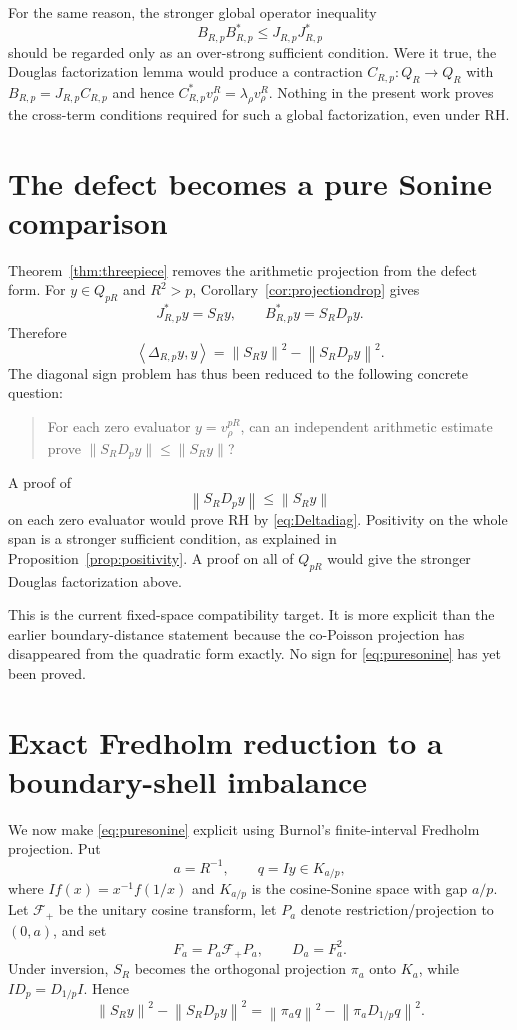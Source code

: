 \documentclass[11pt]{article}
\theoremstyle{remark}
\newcommand{\norm}[1]{\left\lVert #1\right\rVert}
\newcommand{\ip}[2]{\left\langle #1,#2\right\rangle}
\begin{document}
For the same reason, the stronger global operator inequality
\begin{equation}\label{eq:globalpositive}
 B_{R,p}B_{R,p}^*\le J_{R,p}J_{R,p}^*
\end{equation}
should be regarded only as an over-strong sufficient condition. Were it true, the Douglas factorization lemma would produce a contraction $C_{R,p}:Q_R\to Q_R$ with $B_{R,p}=J_{R,p}C_{R,p}$ and hence $C_{R,p}^*v_\rho^R=\lambda_\rho v_\rho^R$. Nothing in the present work proves the cross-term conditions required for such a global factorization, even under RH.

\section{The defect becomes a pure Sonine comparison}
Theorem~\ref{thm:threepiece} removes the arithmetic projection from the defect form. For $y\in Q_{pR}$ and $R^2>p$, Corollary~\ref{cor:projectiondrop} gives
\[
 J_{R,p}^*y=S_Ry,
 \qquad
 B_{R,p}^*y=S_RD_py.
\]
Therefore
\begin{equation}\label{eq:puresonine}
 \ip{\Delta_{R,p}y}{y}
 =\norm{S_Ry}^2-\norm{S_RD_py}^2.
\end{equation}
The diagonal sign problem has thus been reduced to the following concrete question:
\begin{quote}
For each zero evaluator $y=v_\rho^{pR}$, can an independent arithmetic estimate prove $\|S_RD_py\|\le\|S_Ry\|$?
\end{quote}
A proof of
\[
 \norm{S_RD_py}\le\norm{S_Ry}
\]
on each zero evaluator would prove RH by \eqref{eq:Deltadiag}. Positivity on the whole span is a stronger sufficient condition, as explained in Proposition~\ref{prop:positivity}. A proof on all of $Q_{pR}$ would give the stronger Douglas factorization above.

This is the current fixed-space compatibility target. It is more explicit than the earlier boundary-distance statement because the co-Poisson projection has disappeared from the quadratic form exactly. No sign for \eqref{eq:puresonine} has yet been proved.


\section{Exact Fredholm reduction to a boundary-shell imbalance}
We now make \eqref{eq:puresonine} explicit using Burnol's finite-interval Fredholm projection. Put
\[
 a=R^{-1},\qquad q=Iy\in K_{a/p},
\]
where $I f(x)=x^{-1}f(1/x)$ and $K_{a/p}$ is the cosine-Sonine space with gap $a/p$. Let $\mathcal F_+$ be the unitary cosine transform, let $P_a$ denote restriction/projection to $(0,a)$, and set
\[
 F_a=P_a\mathcal F_+P_a,\qquad D_a=F_a^2.
\]
Under inversion, $S_R$ becomes the orthogonal projection $\pi_a$ onto $K_a$, while $ID_p=D_{1/p}I$. Hence
\begin{equation}\label{eq:fredholm-start}
 \norm{S_Ry}^2-\norm{S_RD_py}^2
 =\norm{\pi_a q}^2-\norm{\pi_aD_{1/p}q}^2.
\end{equation}
\end{document}
